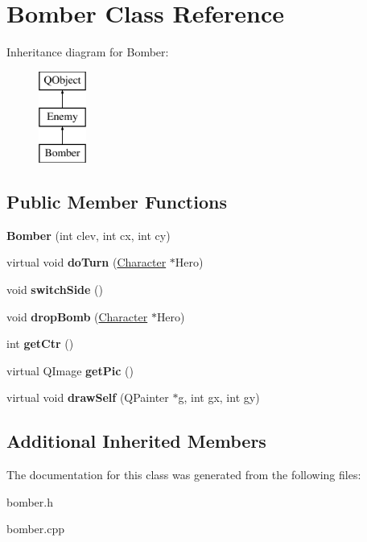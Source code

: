 \hypertarget{class_bomber}{\section{Bomber Class Reference}
\label{class_bomber}
}
Inheritance diagram for Bomber\-:\begin{figure}[H]
\begin{center}
\leavevmode
\includegraphics[height=3.000000cm]{class_bomber}
\end{center}
\end{figure}
\subsection*{Public Member Functions}
\begin{DoxyCompactItemize}
\item 
\hypertarget{class_bomber_a69a81ac540c1330e0e6469d236ec5914}{{\bfseries Bomber} (int clev, int cx, int cy)}\label{class_bomber_a69a81ac540c1330e0e6469d236ec5914}

\item 
\hypertarget{class_bomber_ac0f488834e2abdab290699d6efa6e72e}{virtual void {\bfseries do\-Turn} (\hyperlink{class_character}{Character} $\ast$Hero)}\label{class_bomber_ac0f488834e2abdab290699d6efa6e72e}

\item 
\hypertarget{class_bomber_a1ea183ca52092dc27c08f6595072b3a5}{void {\bfseries switch\-Side} ()}\label{class_bomber_a1ea183ca52092dc27c08f6595072b3a5}

\item 
\hypertarget{class_bomber_a500004b8c74a11109bc8174340f3c72d}{void {\bfseries drop\-Bomb} (\hyperlink{class_character}{Character} $\ast$Hero)}\label{class_bomber_a500004b8c74a11109bc8174340f3c72d}

\item 
\hypertarget{class_bomber_af3d20f9c5832eafe7530a22d04294951}{int {\bfseries get\-Ctr} ()}\label{class_bomber_af3d20f9c5832eafe7530a22d04294951}

\item 
\hypertarget{class_bomber_a3b181f6557c19d65adfddb9226a4edfb}{virtual Q\-Image {\bfseries get\-Pic} ()}\label{class_bomber_a3b181f6557c19d65adfddb9226a4edfb}

\item 
\hypertarget{class_bomber_aa75d9256efa7f2996a599deb3db83f90}{virtual void {\bfseries draw\-Self} (Q\-Painter $\ast$g, int gx, int gy)}\label{class_bomber_aa75d9256efa7f2996a599deb3db83f90}

\end{DoxyCompactItemize}
\subsection*{Additional Inherited Members}


The documentation for this class was generated from the following files\-:\begin{DoxyCompactItemize}
\item 
bomber.\-h\item 
bomber.\-cpp\end{DoxyCompactItemize}
